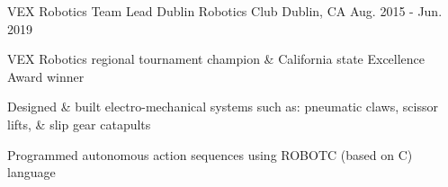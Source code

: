 \begin{cventries}



 \cventry
 {VEX Robotics Team Lead} %
 {Dublin Robotics Club} %
 {Dublin, CA} %
 {Aug. 2015 - Jun. 2019} %
 { %
 \begin{cvitems}
 \item {VEX Robotics regional tournament champion \& California state Excellence Award winner}
 \item {Designed \& built electro-mechanical systems such as: pneumatic claws, scissor lifts, \& slip gear catapults}
 \item {Programmed autonomous action sequences using ROBOTC (based on C) language}
\end{cvitems}
}







\end{cventries}
